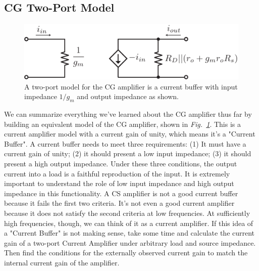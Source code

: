 \subsection{CG Two-Port Model}
\begin{figure}[tb]
\centering
\includegraphics[scale=.9]{cg_model}
\caption{A two-port model for the CG amplifier is a current buffer with input impedance $1/g_m$ and output impedance as shown.}
\label{fig:cg_model}
\end{figure}
We can summarize everything we've learned about the CG amplifier thus far by building an equivalent model of the CG amplifier, shown in \emph{Fig.~\ref{fig:cg_model}}.  This is a current amplifier model with a current gain of unity, which means it's a "Current Buffer".  A current buffer needs to meet three requirements:  (1) It must have a current gain of unity; (2) it should present a low input impedance;  (3) it should present a high output impedance.  Under these three conditions, the output current into a load is a faithful reproduction of the input.  It is extremely important to understand the role of low input impedance and high output impedance in this functionality.  A CS amplifier is not a good current buffer because it fails the first two criteria.  It's not even a good current amplifier because it does not satisfy the second criteria at low frequencies.  At sufficiently high frequencies, though, we can think of it as a current amplifier.   If this idea of a "Current Buffer" is not making sense, take some time and calculate the current gain of a two-port Current Amplifier under arbitrary load and source impedance.  Then find the conditions for the externally observed current gain to match the internal current gain of the amplifier.
